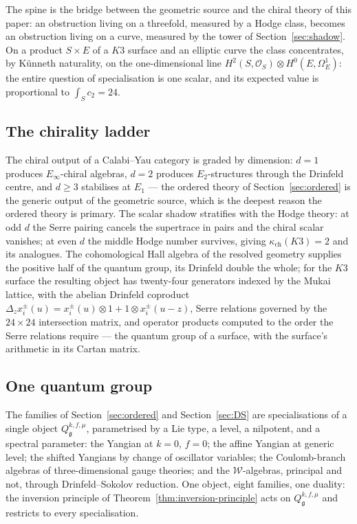 \documentclass[11pt]{amsart}
\numberwithin{equation}{section}
\theoremstyle{plain}
\theoremstyle{definition}
\theoremstyle{remark}
\newcommand{\cW}{\mathcal{W}}
\newcommand{\fg}{\mathfrak{g}}
\begin{document}
The spine is the bridge between the geometric source and the chiral
theory of this paper: an obstruction living on a threefold, measured
by a Hodge class, becomes an obstruction living on a curve, measured
by the tower of Section~\ref{sec:shadow}. On a product $S\times E$
of a $K3$ surface and an elliptic curve the class concentrates, by
K\"unneth naturality, on the one-dimensional line
$H^{2}(S,\mathcal{O}_S)\otimes H^{0}(E,\Omega^{1}_E)$: the entire
question of specialisation is one scalar, and its expected value is
proportional to $\int_S c_2=24$.

\subsection{The chirality ladder}

The chiral output of a Calabi--Yau category is graded by dimension:
$d=1$ produces $E_\infty$-chiral algebras, $d=2$ produces
$E_2$-structures through the Drinfeld centre, and $d\geq3$
stabilises at $E_1$ --- the ordered theory of
Section~\ref{sec:ordered} is the generic output of the geometric
source, which is the deepest reason the ordered theory is primary.
The scalar shadow stratifies with the Hodge theory: at odd $d$ the
Serre pairing cancels the supertrace in pairs and the chiral scalar
vanishes; at even $d$ the middle Hodge number survives, giving
$\kappa_{\mathrm{ch}}(K3)=2$ and its analogues. The cohomological
Hall algebra of the resolved geometry supplies the positive half of
the quantum group, its Drinfeld double the whole; for the $K3$
surface the resulting object has twenty-four generators indexed by
the Mukai lattice, with the abelian Drinfeld coproduct
$\Delta_z x^{\pm}_i(u)=x^{\pm}_i(u)\otimes1+1\otimes
x^{\pm}_i(u-z)$, Serre relations governed by the $24\times24$
intersection matrix, and operator products computed to the order the Serre relations
require --- the quantum group of a surface, with the surface's
arithmetic in its Cartan matrix.

\subsection{One quantum group}

The families of Section~\ref{sec:ordered} and Section~\ref{sec:DS}
are specialisations of a single object $Q^{k,f,\mu}_{\fg}$,
parametrised by a Lie type, a level, a nilpotent, and a spectral
parameter: the Yangian at $k=0$, $f=0$; the affine Yangian at generic
level; the shifted Yangians by change of oscillator variables; the
Coulomb-branch algebras of three-dimensional gauge theories; and the
$\cW$-algebras, principal and not, through Drinfeld--Sokolov
reduction. One object, eight families, one duality: the inversion
principle of Theorem~\ref{thm:inversion-principle} acts on
$Q^{k,f,\mu}_{\fg}$ and restricts to every specialisation.
\end{document}

